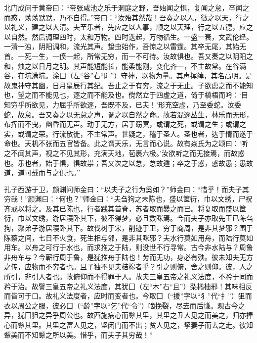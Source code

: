 \documentclass[]{article}
\begin{document}
北门成问于黄帝曰：``帝张咸池之乐于洞庭之野，吾始闻之惧，复闻之怠，卒闻之而惑，荡荡默默，乃不自得。''帝曰：``汝殆其然哉！吾奏之以人，徵之以天，行之以礼义，建之以大清。夫至乐者，先应之以人事，顺之以天理，行之以五德，应之以自然。然后调理四时，太和万物。四时迭起，万物循生。一盛一衰，文武伦经。一清一浊，阴阳调和，流光其声。蛰虫始作，吾惊之以雷霆。其卒无尾，其始无首。一死一生，一偾一起，所常无穷，而一不可待。汝故惧也。吾又奏之以阴阳之和，烛之以日月之明。其声能短能长，能柔能刚，变化齐一，不主故常。在谷满谷，在坑满坑。涂囗（左``谷''右``阝''）守神，以物为量。其声挥绰，其名高明。是故鬼神守其幽，日月星辰行其纪。吾止之于有穷，流之于无止。子欲虑之而不能知也，望之而不能见也，逐之而不能及也。傥然立于四虚之道，倚于槁梧而吟：`目知穷乎所欲见，力屈乎所欲逐，吾既不及，已夫！'形充空虚，乃至委蛇。汝委蛇，故怠。吾又奏之以无怠之声，调之以自然之命。故若混逐丛生，林乐而无形，布挥而不曳，幽昏而无声。动于无方，居于窈冥，或谓之死，或谓之生；或谓之实，或谓之荣。行流散徙，不主常声。世疑之，稽于圣人。圣也者，达于情而遂于命也。天机不张而五官皆备。此之谓天乐，无言而心说。故有焱氏为之颂曰：`听之不闻其声，视之不见其形，充满天地，苞裹六极。'汝欲听之而无接焉，而故惑也。乐也者，始于惧，惧故祟；吾又次之以怠，怠故遁；卒之于惑，惑故愚；愚故道，道可载而与之俱也。''

孔子西游于卫，颜渊问师金曰：``以夫子之行为奚如？''师金曰：``惜乎！而夫子其穷哉！''颜渊曰：``何也？''师金曰：``夫刍狗之未陈也，盛以箧衍，巾以文绣，尸祝齐戒以将之。及其已陈也，行者践其首脊，苏者取而爨之而已。将复取而盛以箧衍，巾以文绣，游居寝卧其下，彼不得梦，必且数眯焉。今而夫子亦取先王已陈刍狗，聚弟子游居寝卧其下。故伐树于宋，削迹于卫，穷于商周，是非其梦邪？围于陈蔡之间，七日不火食，死生相与邻，是非其眯邪？夫水行莫如用舟，而陆行莫如用车。以舟之可行于水也，而求推之于陆，则没世不行寻常。古今非水陆与？周鲁非舟车与？今蕲行周于鲁，是犹推舟于陆也！劳而无功，身必有殃。彼未知夫无方之传，应物而不穷者也。且子独不见夫桔槔者乎？引之则俯，舍之则仰。彼，人之所引，非引人者也。故俯仰而不得罪于人。故夫三皇五帝之礼义法度，不矜于同而矜于治。故譬三皇五帝之礼义法度，其犹囗（左``木''右``且''）梨橘柚邪！其味相反而皆可于口。故礼义法度者，应时而变者也。今取囗（``援''字以``犭''代``扌''）狙而衣以周公之服，彼必囗（``龄''字以``乞''代``令''）啮挽裂，尽去而后慊。观古今之异，犹囗狙之异乎周公也。故西施病心而颦其里，其里之丑人见之而美之，归亦捧心而颦其里。其里之富人见之，坚闭门而不出；贫人见之，挈妻子而去之走。彼知颦美而不知颦之所以美。惜乎，而夫子其穷哉！''
\end{document}
